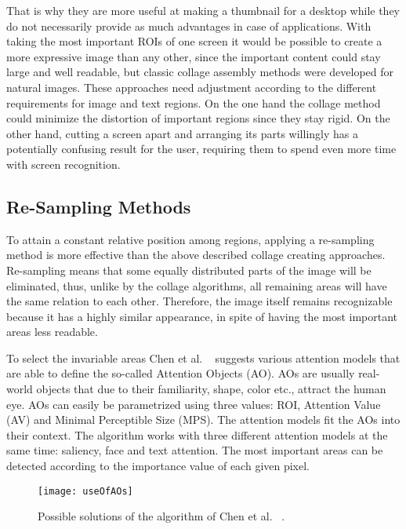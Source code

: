 \documentclass[draft,final]{vutinfth} %
\begin{document}
	That is why they are more useful at making a thumbnail for a desktop while they do not necessarily provide as much advantages in case of applications.
	With taking the most important ROIs of one screen it would be possible to create a  more expressive image than any other, since the important content could stay large and well readable, but classic collage assembly methods were developed for natural images. 
	These approaches need adjustment according to the different requirements for image and text regions.
	On the one hand the collage method could minimize the distortion of important regions since they stay rigid.
	On the other hand, cutting a screen apart and arranging its parts willingly has a potentially confusing result for the user, requiring them to spend even more time with screen recognition.
	
	\subsection{Re-Sampling Methods}
	\label{relatedWork:resampling}
	To attain a constant relative position among regions, applying a re-sampling method is more effective than the above described collage creating approaches.
	Re-sampling means that some equally distributed parts of the image will be eliminated, thus, unlike by the collage algorithms, all remaining areas will have the same relation to each other.
	Therefore, the image itself remains recognizable because it has a highly similar appearance, in spite of having the most important areas less readable.\par 
	To select the invariable areas Chen et al. ~\cite{chen2003visual} suggests various attention models that are able to define the so-called Attention Objects (AO).
	AOs are usually real-world objects that due to their familiarity, shape, color etc., attract the human eye.
	AOs can easily be parametrized using three values: ROI, Attention Value (AV) and Minimal Perceptible Size (MPS).
	The attention models fit the AOs into their context.
	The algorithm works with three different attention models at the same time: saliency, face and text attention.
	The most important areas can be detected according to the importance value of each given pixel.\par 
	\begin{figure}[h]
		\centering		
		\texttt{[image: useOfAOs]}
		\caption{Possible solutions of the algorithm of Chen et al. ~\cite{chen2003visual}.}
		\label{fig:useOfAOs}
	\end{figure}
\end{document}
